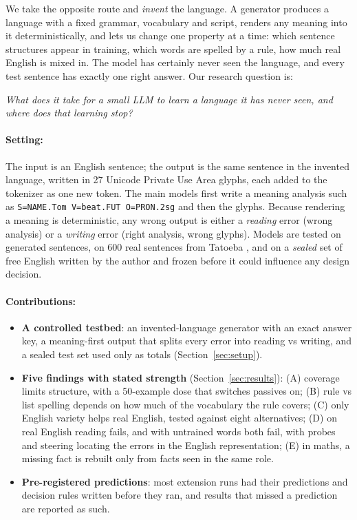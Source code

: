 \documentclass{article} %
\newcommand{\an}[1]{\texttt{#1}}
\begin{document}
We take the opposite route and \emph{invent} the language. A generator produces a language with a fixed grammar,
vocabulary and script, renders any meaning into it deterministically, and lets us change one property at a time:
which sentence structures appear in training, which words are spelled by a rule, how much real English is mixed in.
The model has certainly never seen the language, and every test sentence has exactly one right answer. Our
research question is:

\begin{center}
\emph{What does it take for a small LLM to learn a language it has never seen, and where does that learning stop?}
\end{center}

\paragraph{Setting:} The input is an English sentence; the output is the same sentence in the invented language,
written in 27 Unicode Private Use Area glyphs, each added to the tokenizer as one new token. The main models first
write a meaning analysis such as \an{S=NAME.Tom V=beat.FUT O=PRON.2sg} and then the glyphs. Because rendering a
meaning is deterministic, any wrong output is either a \emph{reading} error (wrong analysis) or a \emph{writing}
error (right analysis, wrong glyphs). Models are tested on generated sentences, on 600 real sentences from Tatoeba
\citep{tatoeba}, and on a \emph{sealed} set of free English written by the author and frozen before it could
influence any design decision.

\paragraph{Contributions:}
\begin{itemize}
\item \textbf{A controlled testbed}: an invented-language generator with an exact answer key, a meaning-first
output that splits every error into reading vs writing, and a sealed test set used only as totals (Section~\ref{sec:setup}).
\item \textbf{Five findings with stated strength} (Section~\ref{sec:results}): (A) coverage limits structure,
with a 50-example dose that switches passives on; (B) rule vs list spelling depends on how much of the vocabulary the
rule covers; (C) only English variety helps real English, tested against eight alternatives; (D) on real English
reading fails, and with untrained words both fail, with probes and steering locating the errors in the English
representation; (E) in maths, a missing fact is rebuilt only from facts seen in the same role.
\item \textbf{Pre-registered predictions}: most extension runs had their predictions and decision rules written
before they ran, and results that missed a prediction are reported as such.
\end{itemize}
\end{document}
